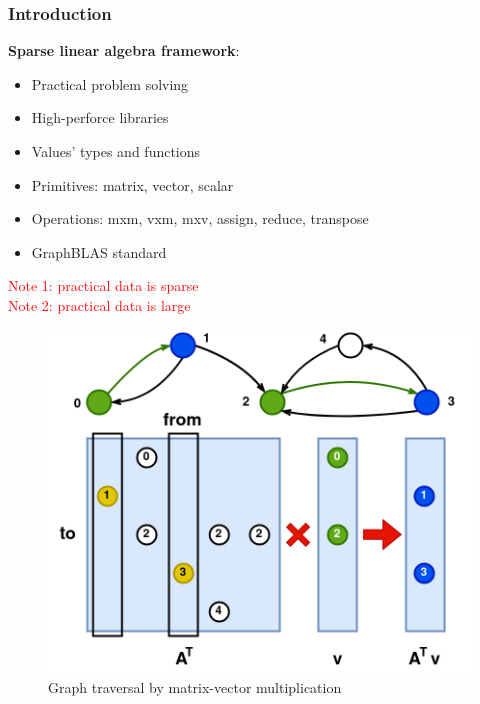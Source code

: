 \documentclass[aspectratio=169,xcolor=table,english]{beamer}
\begin{document}
\begin{frame}[fragile] \frametitle{Introduction}
    \begin{minipage}[m]{0.5\linewidth}
        \textbf{Sparse linear algebra framework}:
        \begin{itemize}
            \item Practical problem solving
            \item High-perforce libraries
            \item Values' types and functions
            \item Primitives: matrix, vector, scalar
            \item Operations: mxm, vxm, mxv, assign, reduce, transpose
            \item GraphBLAS standard
        \end{itemize}   
        \vspace{0.2cm}
        \textcolor{red}{Note 1: practical data is sparse\\Note 2: practical data is large}
    \end{minipage}\hfill
    \begin{minipage}[m]{0.45\linewidth}
        \begin{figure}
            \centering
            \includegraphics[width=\textwidth]{figures/graph_traversal.png}
            \caption{Graph traversal by matrix-vector multiplication}
            \label{fig:traversal}
        \end{figure}
    \end{minipage}
\end{frame}
\end{document}

